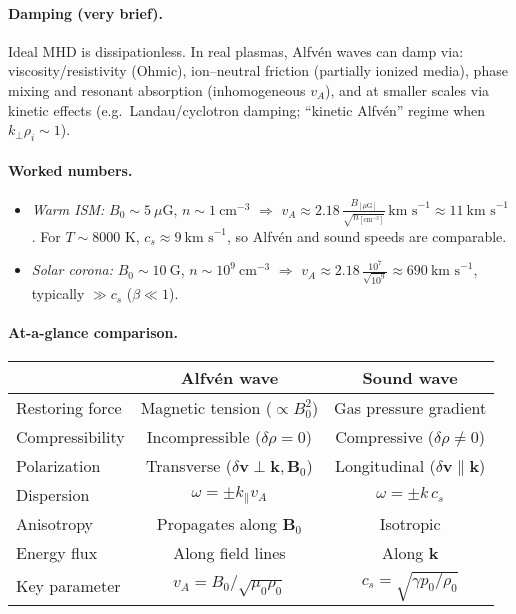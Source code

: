 \paragraph{Damping (very brief).}
Ideal MHD is dissipationless. In real plasmas, Alfv\'en waves can damp via:
viscosity/resistivity (Ohmic), ion–neutral friction (partially ionized media), phase mixing and resonant absorption (inhomogeneous $v_A$), and at smaller scales via kinetic effects (e.g.\ Landau/cyclotron damping; ``kinetic Alfv\'en'' regime when $k_\perp \rho_i\!\sim\!1$).
%
\paragraph{Worked numbers.}
\begin{itemize}
\item \emph{Warm ISM:} $B_0\!\sim\!5~\mu\text{G}$, $n\!\sim\!1~\text{cm}^{-3}$ $\Rightarrow$ 
$v_A \approx 2.18\,\frac{B_{[\mu\text{G}]}}{\sqrt{n_{[\text{cm}^{-3}]}}}\,\text{km s}^{-1} \approx 11~\text{km s}^{-1}$.
For $T\!\sim\!8000$ K, $c_s\!\approx\!9~\text{km s}^{-1}$, so Alfv\'en and sound speeds are comparable.
\item \emph{Solar corona:} $B_0\!\sim\!10~\text{G}$, $n\!\sim\!10^9~\text{cm}^{-3}$ $\Rightarrow$
$v_A \approx 2.18\,\frac{10^7}{\sqrt{10^9}} \approx 690~\text{km s}^{-1}$, typically $\gg c_s$ ($\beta\ll1$).
\end{itemize}

\paragraph{At-a-glance comparison.}
\begin{center}
\begin{tabular}{lcc}
\toprule
 & \textbf{Alfv\'en wave} & \textbf{Sound wave} \\
\midrule
Restoring force & Magnetic tension ($\propto B_0^2$) & Gas pressure gradient \\
Compressibility & Incompressible ($\delta \rho=0$) & Compressive ($\delta \rho\neq 0$) \\
Polarization & Transverse ($\delta\mathbf{v}\perp \mathbf{k},\mathbf{B}_0$) & Longitudinal ($\delta\mathbf{v}\parallel \mathbf{k}$) \\
Dispersion & $\omega=\pm k_\parallel v_A$ & $\omega=\pm k\,c_s$ \\
Anisotropy & Propagates along $\mathbf{B}_0$ & Isotropic \\
Energy flux & Along field lines & Along $\mathbf{k}$ \\
Key parameter & $v_A=B_0/\sqrt{\mu_0\rho_0}$ & $c_s=\sqrt{\gamma p_0/\rho_0}$ \\
\bottomrule
\end{tabular}
\end{center}


